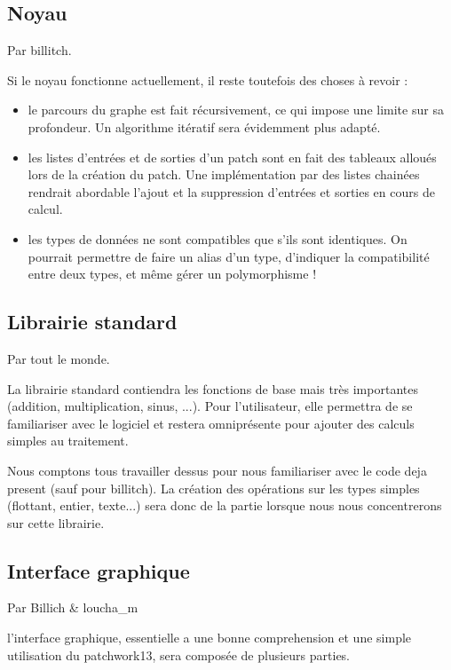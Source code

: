 \documentclass[14pt,a4paper]{article}
\begin{document}
\subsection{Noyau}
Par billitch.
\\
\par
Si le noyau fonctionne actuellement, il reste toutefois des choses \`a revoir :
\begin{itemize}
\item le parcours du graphe est fait r\'ecursivement, ce qui impose une
 limite sur sa profondeur. Un algorithme it\'eratif sera \'evidemment
 plus adapt\'e.
\item les listes d'entr\'ees et de sorties d'un patch sont en fait des
 tableaux allou\'es lors de la cr\'eation du patch. Une impl\'ementation
 par des listes chain\'ees rendrait abordable l'ajout et la suppression
 d'entr\'ees et sorties en cours de calcul.
\item les types de donn\'ees ne sont compatibles que s'ils sont
 identiques. On pourrait permettre de faire un alias d'un type,
 d'indiquer la compatibilit\'e entre deux types, et m\^eme g\'erer
 un polymorphisme !
\end{itemize}


\subsection{Librairie standard}
Par tout le monde.\\
\par
La librairie standard contiendra les fonctions de base mais tr\`es
 importantes (addition, multiplication, sinus, ...). Pour l'utilisateur, elle
 permettra de se familiariser avec le logiciel et restera omnipr\'esente
 pour ajouter des calculs simples au traitement.\\
\par
Nous comptons tous travailler dessus pour nous familiariser avec le code
 deja present (sauf pour billitch). La cr\'eation des op\'erations sur les
 types simples (flottant, entier, texte...) sera donc de la partie lorsque
 nous nous concentrerons sur cette librairie.

\subsection{Interface graphique}
\par
Par Billich \& loucha\_m
\\
\par
l'interface graphique, essentielle a une bonne comprehension et une
 simple utilisation du patchwork13, sera compos\'ee de plusieurs parties.
\end{document}
